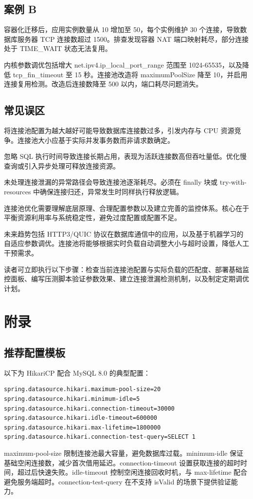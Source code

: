 \section{案例 B}
容器化迁移后，应用实例数量从 10 增加至 50，每个实例维护 30 个连接，导致数据库服务器 TCP 连接数超过 1500。排查发现容器 NAT 端口映射耗尽，部分连接处于 TIME\_{}WAIT 状态无法复用。\par
内核参数调优包括增大 net.ipv4.ip\_{}local\_{}port\_{}range 范围至 1024-65535，以及降低 tcp\_{}fin\_{}timeout 至 15 秒。连接池改造将 maximumPoolSize 降至 10，并启用连接复用检测。改造后连接数降至 500 以内，端口耗尽问题消失。\par
\section{常见误区}
将连接池配置为越大越好可能导致数据库连接数过多，引发内存与 CPU 资源竞争。连接池大小应基于实际并发事务数而非请求数确定。\par
忽略 SQL 执行时间导致连接长期占用，表现为活跃连接数高但吞吐量低。优化慢查询或引入异步处理可释放连接资源。\par
未处理连接泄漏的异常路径会导致连接池逐渐耗尽。必须在 finally 块或 try-with-resources 中确保连接归还，异常发生时同样执行释放逻辑。\par
连接池优化需要理解底层原理、合理配置参数以及建立完善的监控体系。核心在于平衡资源利用率与系统稳定性，避免过度配置或配置不足。\par
未来趋势包括 HTTP3/QUIC 协议在数据库通信中的应用，以及基于机器学习的自适应参数调优。连接池将能够根据实时负载自动调整大小与超时设置，降低人工干预需求。\par
读者可立即执行以下步骤：检查当前连接池配置与实际负载的匹配度、部署基础监控面板、编写压测脚本验证参数效果、建立连接泄漏检测机制，以及制定定期调优计划。\par
\chapter{附录}
\section{推荐配置模板}
以下为 HikariCP 配合 MySQL 8.0 的典型配置：\par
\begin{lstlisting}[language=properties]
spring.datasource.hikari.maximum-pool-size=20
spring.datasource.hikari.minimum-idle=5
spring.datasource.hikari.connection-timeout=30000
spring.datasource.hikari.idle-timeout=600000
spring.datasource.hikari.max-lifetime=1800000
spring.datasource.hikari.connection-test-query=SELECT 1
\end{lstlisting}
maximum-pool-size 限制连接池最大容量，避免数据库过载。minimum-idle 保证基础空闲连接数，减少首次借用延迟。connection-timeout 设置获取连接的超时时间，超过后快速失败。idle-timeout 控制空闲连接回收时机，与 max-lifetime 配合避免服务端超时。connection-test-query 在不支持 isValid 的场景下提供验证能力。\par
